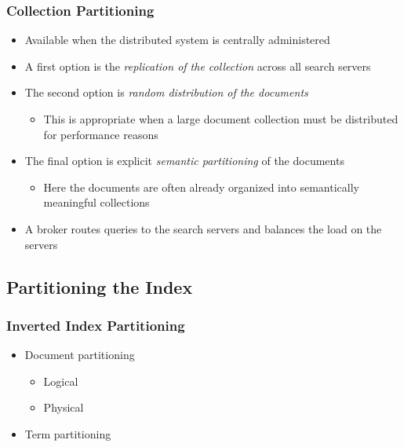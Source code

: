 \documentclass{beamer}
\begin{document}
\begin{frame}
    \frametitle{Collection Partitioning}
    
    \begin{itemize}
    \item Available when the distributed system is centrally administered
    \item A first option is the \emph{replication of the collection} across all
        search servers
    \item The second option is \emph{random distribution of the documents}
        \begin{itemize}
        \item This is appropriate when a large document collection must be
            distributed for performance reasons
        \end{itemize}
    \item The final option is explicit \emph{semantic partitioning} of the
        documents
        \begin{itemize}
        \item Here the documents are often already organized into semantically
            meaningful collections
        \end{itemize}
    \item A broker routes queries to the search servers and balances the load
        on the servers
    \end{itemize}
\end{frame}

\subsection{Partitioning the Index}

\begin{frame}
    \frametitle{Inverted Index Partitioning}
    \begin{itemize}
    \item Document partitioning
        \begin{itemize}
        \item Logical
        \item Physical
        \end{itemize}
    \item Term partitioning
    \end{itemize}
\end{frame}
\end{document}
